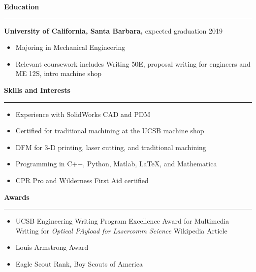 \documentclass[12pt, oneside]{article}
\newcommand{\headingstyleJobs}[1] {
	{\fontsize{20pt}{1em}\selectfont \bf \textcolor{new_red}{#1}}
	\textcolor{new_red}{\rule{3.25in}{0.5pt}} \vspace{3pt}
}
\newcommand{\headingstyleSJobs}[1] {
	{\fontsize{20pt}{1em}\selectfont \bf \textcolor{new_red}{#1}}
	\textcolor{new_red}{\rule{3.25in}{0.5pt}} \vspace{-10pt}
}
\newcommand{\jobtitle}[2] {
	{\bf #1} {#2} \vspace{-10pt} \\
}
\begin{document}
\begin{flushleft}
\headingstyleJobs{Education}


\jobtitle{University of California, Santa Barbara,}{expected graduation 2019}
\begin{itemize}
	\item Majoring in Mechanical Engineering
	\item Relevant coursework includes Writing 50E, proposal writing for engineers and ME 12S, intro machine shop
\end{itemize}


\headingstyleSJobs{Skills and Interests}

\begin{itemize}
	\item Experience with SolidWorks CAD and PDM \\
	\item Certified for traditional machining at the UCSB machine shop \\
	\item DFM for 3-D printing, laser cutting, and traditional machining \\
	\item Programming in C++, Python, Matlab, \LaTeX, and Mathematica \\
	\item CPR Pro and Wilderness First Aid certified \\ %
\end{itemize}


\headingstyleSJobs{Awards}

\begin{itemize}
	\item UCSB Engineering Writing Program Excellence Award for Multimedia Writing for \textit{Optical PAyload for Lasercomm Science} Wikipedia Article
	\item Louis Armstrong Award
	\item Eagle Scout Rank, Boy Scouts of America
\end{itemize}

\end{flushleft}
\end{document}
